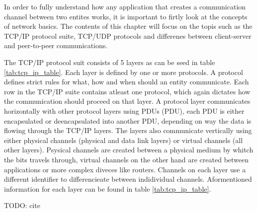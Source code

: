 In order to fully understand how any application that creates a communication channel between two entites works, it is important to firtly look at the concepts of network basics. The contents of this chapter will focus on the topis such as the TCP/IP protocol suite, TCP/UDP protocols and differenes between client-server and peer-to-peer communications.

The TCP/IP protocol suit consists of 5 layers as can be seed in table \ref{tab:tcp_ip_table}. Each layer is defined by one or more protocols. A protocol defines strict rules for what, how and when should an entity communicate. Each row in the TCP/IP suite contains atleast one protocol, which again dictates how the communication should proceed on that layer. A protocol layer communicates horizontally with other protocol layers using PDUs (\acl{PDU}), each PDU is either encapsulated or deencapsulated into another PDU, depending on way the data is flowing through the TCP/IP layers. The layers also communicate vertically using either physical channels (physical and data link layers) or virtual channels (all other layers). Psysical channels are created between a physical medium by whitch the bits travels through, virtual channels on the other hand are created between applications or more complex diveces like routers. Channels on each layer use a different identifier to differencieate between indidividual channels. Aformentioned information for each layer can be found in table \ref{tab:tcp_ip_table}.




TODO: cite

